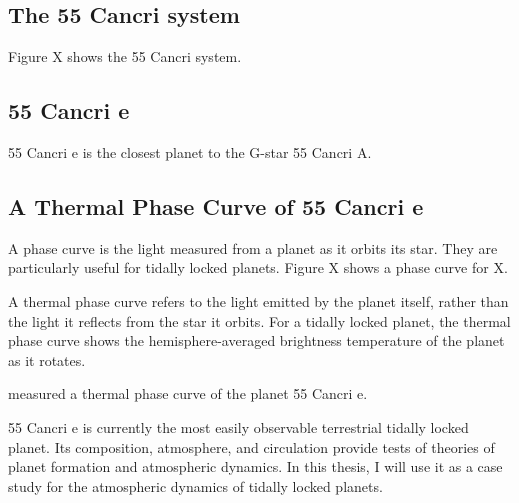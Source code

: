 \subsection*{The 55 Cancri system}

Figure X shows the 55 Cancri system.

\subsection*{55 Cancri e}

55 Cancri e is the closest planet to the G-star 55 Cancri A.

\subsection*{A Thermal Phase Curve of 55 Cancri e}

A phase curve is the light measured from a planet as it orbits its star. They are particularly useful for tidally locked planets. Figure X shows a phase curve for X.

A thermal phase curve refers to the light emitted by the planet itself, rather than the light it reflects from the star it orbits. For a tidally locked planet, the thermal phase curve shows the hemisphere-averaged brightness temperature of the planet as it rotates.

\citet{demory201655cnce} measured a thermal phase curve of the planet 55 Cancri e.




55 Cancri e is currently the most easily observable terrestrial tidally locked planet. Its composition, atmosphere, and circulation provide tests of theories of planet formation and atmospheric dynamics. In this thesis, I will use it as a case study for the atmospheric dynamics of tidally locked planets.



% 
% 
